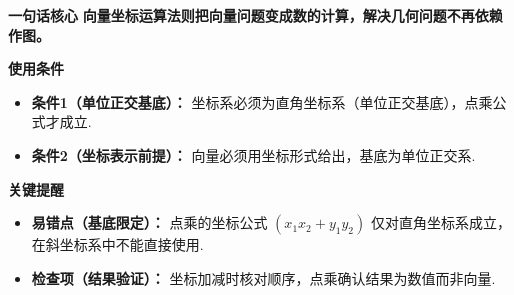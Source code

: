 \begin{summarybox}
	\textbf{\textcolor{CSummary}{一句话核心}}
	\textbf{向量坐标运算法则把向量问题变成数的计算，解决几何问题不再依赖作图。}

	\medskip
	\textbf{\textcolor{CSummary}{使用条件}}
	\begin{itemize}[leftmargin=*, itemsep=0.5em, topsep=0.4em]
		\item \textbf{条件1（单位正交基底）：} 坐标系必须为直角坐标系（单位正交基底），点乘公式才成立.
		\item \textbf{条件2（坐标表示前提）：} 向量必须用坐标形式给出，基底为单位正交系.
	\end{itemize}

	\medskip
	\textbf{\textcolor{CSummary}{关键提醒}}
	\begin{itemize}[leftmargin=*, itemsep=0.5em, topsep=0.4em]
		\item \textbf{易错点（基底限定）：} 点乘的坐标公式 $(x_1x_2+y_1y_2)$ 仅对直角坐标系成立，在斜坐标系中不能直接使用.
		\item \textbf{检查项（结果验证）：} 坐标加减时核对顺序，点乘确认结果为数值而非向量.
	\end{itemize}

\end{summarybox}

